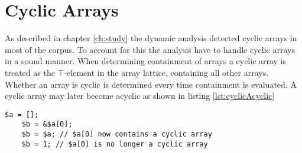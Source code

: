 \section{Cyclic Arrays}
As described in chapter \ref{ch:study} the dynamic analysis detected cyclic arrays in most of the corpus. To account for this the analysis have to handle cyclic arrays in a sound manner. When determining containment of arrays a cyclic array is treated as the $\top$-element in the array lattice, containing all other arrays. Whether an array is cyclic is determined every time containment is evaluated. A cyclic array may later become acyclic as shown in listing \ref{lst:cyclicAcyclic}

\begin{lstlisting}[caption={Cyclic to Acyclic array},label={lst:cyclicAcyclic}]
    $a = [];
    $b = &$a[0];
    $b = $a; // $a[0] now contains a cyclic array
    $b = 1; // $a[0] is no longer a cyclic array
\end{lstlisting}

